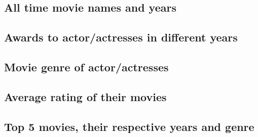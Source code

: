 \documentclass[12pt]{article}
\begin{document}
\subsection{All time movie names and years} \label{movies}

\subsection{Awards to actor/actresses in different years} \label{awards}

\subsection{Movie genre of actor/actresses} \label{genre}

\subsection{Average rating of their movies} \label{average-rating}

\subsection{Top 5 movies, their respective years and genre} \label{top-movies}
\end{document}
